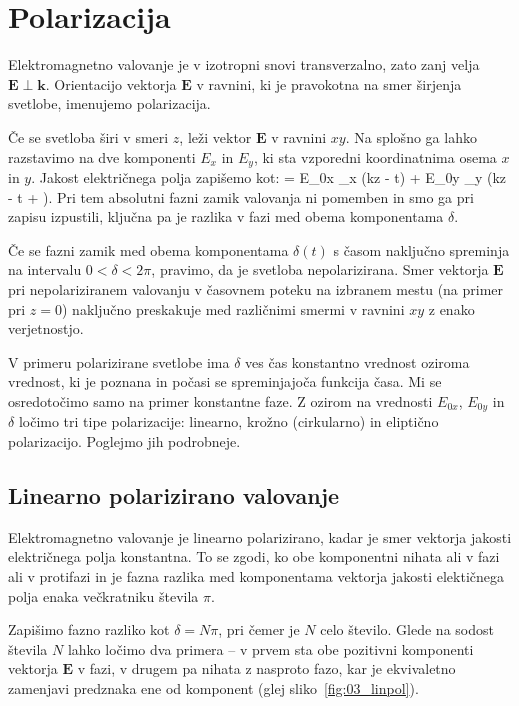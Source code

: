 \section{Polarizacija}
Elektromagnetno valovanje je v izotropni snovi 
transverzalno, zato zanj velja $\mathbf{E} \perp \mathbf{k}$. Orientacijo 
vektorja $\mathbf{E}$ v ravnini, ki je pravokotna na smer
širjenja svetlobe, imenujemo polarizacija.

Če se svetloba širi v smeri $z$, leži vektor $\mathbf{E}$ v ravnini $xy$. 
Na splošno ga lahko razstavimo na dve komponenti $E_x$ in $E_y$, ki sta
vzporedni koordinatnima osema $x$ in $y$. Jakost električnega
polja zapišemo kot:
\beq
{} = E_{0x} _x \cos \left(kz - \omega t\right) + 
E_{0y} _y \cos \left(kz - \omega t + \delta\right)\!.
\label{eq:03_37}
\eeq
Pri tem absolutni fazni zamik valovanja ni pomemben in smo ga 
pri zapisu izpustili, ključna pa je razlika v fazi med obema 
komponentama $\delta$.

Če se fazni zamik med obema komponentama $\delta(t)$ s časom 
naključno spreminja na intervalu $0<\delta <2\pi$, pravimo, da je 
svetloba nepolarizirana. Smer vektorja $\mathbf{E}$ pri nepolariziranem
valovanju v časovnem 
poteku na izbranem mestu (na primer pri $z=0$) naključno preskakuje med
različnimi smermi v ravnini $xy$ z enako verjetnostjo.

V primeru polarizirane svetlobe ima $\delta$ ves čas konstantno 
vrednost oziroma vrednost, ki je poznana in počasi se spreminjajoča 
funkcija časa. Mi se osredotočimo samo na primer konstantne faze. 
Z ozirom na vrednosti $E_{0x}$, $E_{0y}$ in $\delta$ ločimo tri tipe
polarizacije: linearno, krožno (cirkularno) in eliptično polarizacijo. 
Poglejmo jih podrobneje.

\subsection*{Linearno polarizirano valovanje}
Elektromagnetno valovanje je linearno polarizirano, kadar je smer vektorja
jakosti električnega polja konstantna. To se zgodi, ko obe komponentni nihata
ali v fazi ali v protifazi in je fazna razlika med komponentama vektorja 
jakosti elektičnega polja enaka večkratniku števila $\pi$. 

Zapišimo fazno razliko kot $\delta = N\pi$, pri čemer je $N$ celo število. 
Glede na sodost števila $N$ lahko ločimo dva primera -- v prvem sta obe pozitivni komponenti
vektorja $\mathbf{E}$ v fazi, v drugem pa nihata z nasproto fazo, kar je ekvivaletno 
zamenjavi predznaka ene od komponent (glej sliko~\ref{fig:03_linpol}). 


